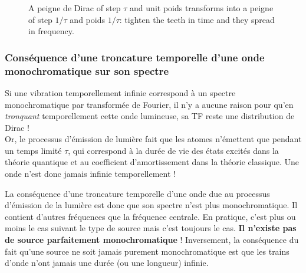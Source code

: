 \begin{figure}[h!]
  \centering
  \caption*{\small A peigne de Dirac of step $\tau$ and unit poids transforms
  into a peigne of step $1/\tau$ and poids $1/\tau$: tighten the teeth in time
  and they spread in frequency.}
\end{figure}

\subsubsection{Conséquence d'une troncature temporelle d'une onde monochromatique sur son spectre}

Si une vibration temporellement infinie correspond à un spectre monochromatique
par transformée de Fourier, il n'y a aucune raison pour qu'en \emph{tronquant}
temporellement cette onde lumineuse, sa TF reste une distribution de Dirac !\\

Or, le processus d'émission de lumière fait que les atomes n'émettent que
pendant un temps limité $\tau$, qui correspond à la durée de vie des états
excités dans la théorie quantique et au coefficient d'amortissement dans la
théorie classique. Une onde n'est donc jamais infinie temporellement !

\begin{conclusion}
  La conséquence d'une troncature temporelle d'une onde due au processus
  d'émission de la lumière est donc que son spectre n'est plus monochromatique.
  Il contient d'autres fréquences que la fréquence centrale. En pratique, c'est
  plus ou moins le cas suivant le type de source mais c'est toujours le cas.
  \textbf{Il n'existe pas de source parfaitement monochromatique} !
  Inversement, la conséquence du fait qu'une source ne soit jamais purement
  monochromatique est que les trains d'onde n'ont jamais une durée (ou une
  longueur) infinie.
\end{conclusion}

